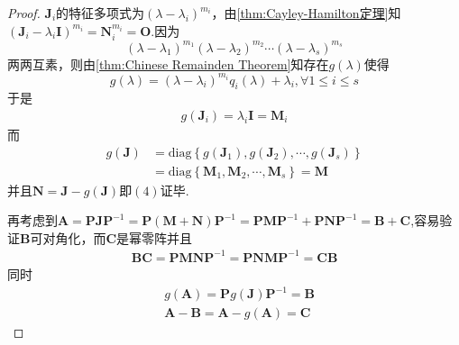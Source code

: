 {\begin{proof}
        $\bm{J}_i$的特征多项式为$\left(\lambda-\lambda_i\right)^{m_i}$，由\cref{thm:Cayley-Hamilton定理}知$
            \left(
            \bm{J}_i-\lambda_i\bm{I}
            \right)^{m_i}=
            \bm{N}_i^{m_i}=\bm{O}
        $.因为\[
            \left(\lambda-\lambda_1\right)^{m_1}\left(\lambda-\lambda_2\right)^{m_2}\cdots\left(\lambda-\lambda_s\right)^{m_s}
        \]两两互素，则由\cref{thm:Chinese Remainden Theorem}知存在$g\left(\lambda\right)$使得\[
            g\left(\lambda\right)=\left(\lambda-\lambda_i\right)^{m_i}q_i\left(\lambda\right)+\lambda_i,\forall 1\leqslant i\leqslant s
        \]于是\begin{align*}
            g\left(\bm{J}_i\right)=\lambda_i\bm{I}=\bm{M}_i
        \end{align*}而\begin{align*}
            g\left(\bm{J}\right) & =\mathrm{diag}\left\{
            g\left(\bm{J}_1\right),g\left(\bm{J}_2\right),\cdots,g\left(\bm{J}_s\right)
            \right\}                                     \\
                                 & =\mathrm{diag}\left\{
            \bm{M}_1,\bm{M}_2,\cdots,\bm{M}_s
            \right\}=\bm{M}
        \end{align*}并且$\bm{N}=\bm{J}-g\left(\bm{J}\right)$即$(4)$证毕.

        再考虑到$\bm{A}=\bm{P}\bm{JP}^{-1}=\bm{P}\left(\bm{M}+\bm{N}\right)\bm{P}^{-1}=\bm{P}\bm{MP}^{-1}+\bm{P}\bm{NP}^{-1}=\bm{B}+\bm{C}$,容易验证$\bm{B}$可对角化，而$\bm{C}$是幂零阵并且\begin{align*}
            \bm{BC}=\bm{PMNP}^{-1}=\bm{PNMP}^{-1}=\bm{CB}
        \end{align*}同时\begin{align*}
             & g\left(\bm{A}\right)=\bm{P}g\left(\bm{J}\right)\bm{P}^{-1}=\bm{B} \\
             & \bm{A}-\bm{B}=\bm{A}-g\left(\bm{A}\right)=\bm{C}
        \end{align*}


\end{proof}}
